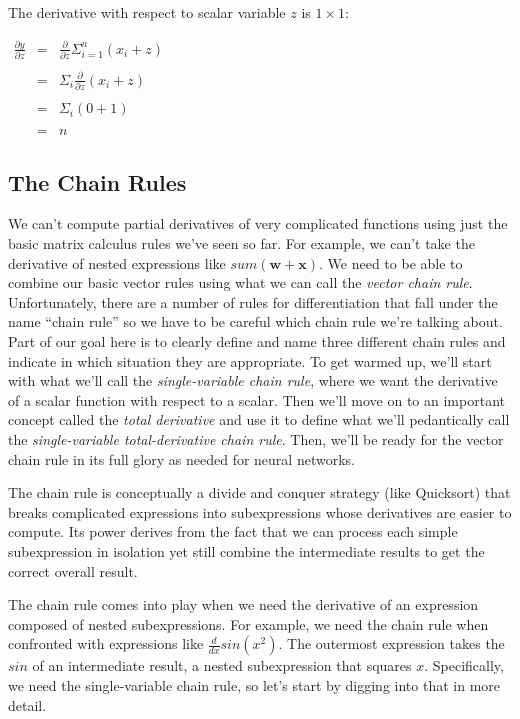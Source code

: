 \documentclass[11pt]{article}
\begin{document}
The derivative with respect to scalar variable $z$ is $1 \times 1$:

$
\begin{array}{lcl}
\frac{\partial y}{\partial z} & = & \frac{\partial}{\partial z} \Sigma_{i=1}^n (x_i+z)\\\\
& = & \Sigma_i \frac{\partial}{\partial z} (x_i+z)\\\\
& = & \Sigma_i (0 + 1)\\\\
& = & n
\end{array}
$

\subsection{The Chain Rules}

We can't compute partial derivatives of very complicated functions using just the basic matrix calculus rules we've seen so far.  For example, we can't take the derivative of nested expressions like $sum(\mathbf{w}+\mathbf{x})$. We need to be able to combine our basic vector rules using what we can call the {\em vector chain rule}.   Unfortunately, there are a number of rules for differentiation that fall under the name ``chain rule'' so we have to be careful which chain rule we're talking about. Part of our goal here is to clearly define and name three different chain rules and indicate in which situation they are appropriate. To get warmed up, we'll start with what we'll call the {\em single-variable chain rule}, where we want the derivative of a scalar function with respect to a scalar. Then we'll move on to an important concept called the {\em total derivative} and use it to define what we'll pedantically call the {\em single-variable total-derivative chain rule}. Then, we'll be ready for the vector chain rule in its full glory as needed for neural networks.

The chain rule is conceptually a divide and conquer strategy (like Quicksort) that breaks complicated expressions into subexpressions whose derivatives are easier to compute.  Its power derives from the fact that we can process each simple subexpression in isolation yet still combine the  intermediate results to get the correct overall result.

The chain rule comes into play when we need the derivative of an expression composed of nested subexpressions. For example, we need the chain rule when confronted with expressions like $\frac{d}{dx} sin(x^2)$.  The outermost expression takes the $sin$ of an intermediate result, a nested subexpression that squares $x$. Specifically, we need the single-variable chain rule, so let's start by digging into that in more detail.
\end{document}
